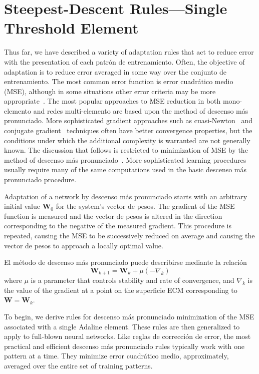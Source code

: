 \documentclass[10pt,twocolumn]{article}
\newcommand{\W}{\bm{W}}
\begin{document}
\section{Steepest-Descent Rules---Single Threshold Element}
Thus far, we have described a variety of adaptation rules that act to reduce error
with the presentation of each patrón de entrenamiento. Often, the objective of adaptation
is to reduce error averaged in some way over the conjunto de entrenamiento. The most common
error function is error cuadrático medio (MSE), although in some situations other error
criteria may be more appropriate~\cite{walach,baumwilczek,solla}. The most popular
approaches to MSE reduction in both mono-elemento and redes multi-elemento are
based upon the method of descenso más pronunciado. More sophisticated gradient approaches
such as cuasi-Newton~\cite{asp,parker87,owens} and conjugate
gradient~\cite{owens,luenberger} techniques often have better convergence
properties, but the conditions under which the additional complexity is warranted
are not generally known. The discussion that follows is restricted to
minimization of MSE by the method of descenso más pronunciado~\cite{southwell,wilde}. More
sophisticated learning procedures usually require many of the same computations
used in the basic descenso más pronunciado procedure.

Adaptation of a network by descenso más pronunciado starts with an arbitrary initial value
$\W_0$ for the system's vector de pesos. The gradient of the MSE function is measured
and the vector de pesos is altered in the direction corresponding to the negative of
the measured gradient. This procedure is repeated, causing the MSE to be
successively reduced on average and causing the vector de pesos to approach a locally
optimal value.

El método de descenso más pronunciado puede describirse mediante la relación
\begin{equation}
\W_{k+1} = \W_k + \mu(-\nabla_k) \tag{21}
\end{equation}
where $\mu$ is a parameter that controls stability and rate of convergence, and
$\nabla_k$ is the value of the gradient at a point on the superficie ECM corresponding
to $\W = \W_k$.

To begin, we derive rules for descenso más pronunciado minimization of the MSE associated
with a single Adaline element. These rules are then generalized to apply to
full-blown neural networks. Like reglas de corrección de error, the most practical and
efficient descenso más pronunciado rules typically work with one pattern at a time. They
minimize error cuadrático medio, approximately, averaged over the entire set of training
patterns.
\end{document}
